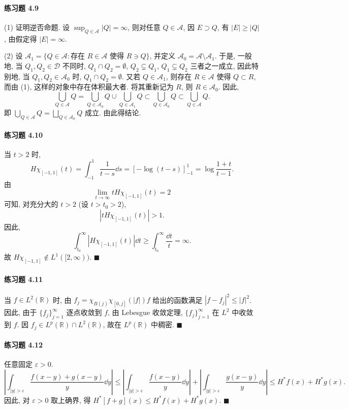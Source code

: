 \paragraph*{练习题 4.9}
(1) 证明逆否命题. 设 $\sup_{Q\in\mathcal{A}}|Q| = \infty$, 则对任意 $Q \in \mathcal{A}$, 因 $E \supset Q$, 有 $|E| \geq |Q|$, 由假定得 $|E| = \infty$.

(2) 设 $\mathcal{A}_{1} = \{Q \in \mathcal{A} : \text{存在 } R \in \mathcal{A} \text{ 使得 } R \ni Q\}$, 并定义 $\mathcal{A}_{0} = \mathcal{A}\setminus\mathcal{A}_{1}$. 于是, 一般地, 当 $Q_{1}, Q_{2} \in \mathcal{D}$ 不同时, $Q_{1}\cap Q_{2} = \emptyset$, $Q_{2} \subsetneq Q_{1}$, $Q_{1} \subsetneq Q_{2}$ 三者之一成立, 因此特别地, 当 $Q_{1}, Q_{2} \in \mathcal{A}_{0}$ 时, $Q_{1}\cap Q_{2} = \emptyset$. 又若 $Q \in \mathcal{A}_{1}$, 则存在 $R \in \mathcal{A}$ 使得 $Q \subset R$, 而由 (1), 这样的对象中存在体积最大者. 将其重新记为 $R$, 则 $R \in \mathcal{A}_{0}$. 因此,
\[
\bigcup_{Q \in \mathcal{A}}Q = \bigcup_{Q \in \mathcal{A}_{0}}Q \cup \bigcup_{Q \in \mathcal{A}_{1}}Q \subset \bigcup_{Q \in \mathcal{A}_{0}}Q \subset \bigcup_{Q \in \mathcal{A}}Q.
\]
即 $\bigcup_{Q\in\mathcal{A}}Q = \bigsqcup_{Q\in\mathcal{A}_{0}}Q$ 成立. 由此得结论.

\paragraph*{练习题 4.10}
当 $t > 2$ 时,
\[
H\chi_{[-1,1]}(t) = \int_{-1}^{1}\frac{1}{t-s}\dd s = [-\log(t-s)]_{-1}^{1} = \log\frac{1+t}{t-1}.
\]
由
\[
\lim_{t \to \infty}tH\chi_{[-1,1]}(t) = 2
\]
可知, 对充分大的 $t > 2$ (设 $t > t_{0} > 2$),
\[
|tH\chi_{[-1,1]}(t)| > 1.
\]
因此,
\[
\int_{t_{0}}^{\infty}|H\chi_{[-1,1]}(t)|\dd t \geq \int_{t_{0}}^{\infty}\frac{\dd t}{t} = \infty.
\]
故 $H\chi_{[-1,1]} \notin L^{1}([2,\infty))$. $\blacksquare$

\paragraph*{练习题 4.11}
当 $f \in L^{2}(\mathbb{R})$ 时, 由 $f_{j} = \chi_{B(j)}\chi_{[0,j]}(|f|)f$ 给出的函数满足 $|f - f_{j}|^{2} \leq |f|^{2}$. 因此, 由于 $\{f_{j}\}_{j=1}^{\infty}$ 逐点收敛到 $f$, 由 Lebesgue 收敛定理, $\{f_{j}\}_{j=1}^{\infty}$ 在 $L^{2}$ 中收敛到 $f$. 因 $f_{j} \in L^{p}(\mathbb{R}) \cap L^{2}(\mathbb{R})$, 故在 $L^{p}(\mathbb{R})$ 中稠密. $\blacksquare$

\paragraph*{练习题 4.12}
任意固定 $\varepsilon > 0$.
\[
\left|\int_{|y|>\varepsilon}\frac{f(x-y)+g(x-y)}{y}\dd y\right| \leq \left|\int_{|y|>\varepsilon}\frac{f(x-y)}{y}\dd y\right| + \left|\int_{|y|>\varepsilon}\frac{g(x-y)}{y}\dd y\right| \leq H^{*}f(x) + H^{*}g(x).
\]
因此, 对 $\varepsilon > 0$ 取上确界, 得 $H^{*}[f+g](x) \leq H^{*}f(x) + H^{*}g(x)$. $\blacksquare$

